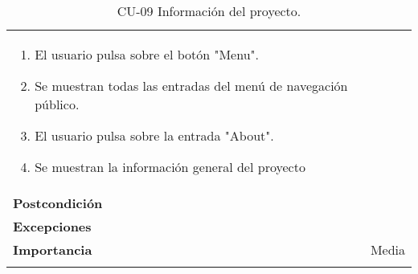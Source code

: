 \begin{longtable}[]{@{}ll@{}}
\begin{minipage}[t]{0.67\columnwidth}
\begin{enumerate}
\def\labelenumi{\arabic{enumi}.}
\tightlist
\item
  El usuario pulsa sobre el botón "Menu".
\item
  Se muestran todas las entradas del menú de navegación público.
\item
  El usuario pulsa sobre la entrada "About".
\item
  Se muestran la información general del proyecto
\end{enumerate}\strut
\end{minipage}\tabularnewline
\begin{minipage}[t]{0.27\columnwidth}\raggedright
\textbf{Postcondición}\strut
\end{minipage} & \begin{minipage}[t]{0.67\columnwidth}\raggedright
\strut
\end{minipage}\tabularnewline
\begin{minipage}[t]{0.27\columnwidth}\raggedright
\textbf{Excepciones}\strut
\end{minipage} & \begin{minipage}[t]{0.67\columnwidth}\raggedright
\strut
\end{minipage}\tabularnewline
\begin{minipage}[t]{0.27\columnwidth}\raggedright
\textbf{Importancia}\strut
\end{minipage} & \begin{minipage}[t]{0.67\columnwidth}\raggedright
Media\strut
\end{minipage}\tabularnewline
\bottomrule
\caption{CU-09 Información del proyecto.}
\end{longtable}

